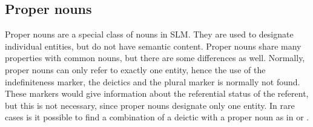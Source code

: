 %





\subsection{Proper nouns}\label{sec:wc:Propernouns}
Proper nouns are a special class of nouns in SLM. They are used to designate individual entities, but do not have semantic content.
Proper nouns share many properties with common nouns, but there are some differences as well. Normally, proper nouns can only refer to exactly one entity, hence the use of the indefiniteness marker, the deictics and the plural marker is normally not found. These markers would give information about the referential status of the referent, but this is not necessary, since proper nouns designate only one entity. In rare cases is it possible to find a combination of a deictic with a proper noun as in  or .




